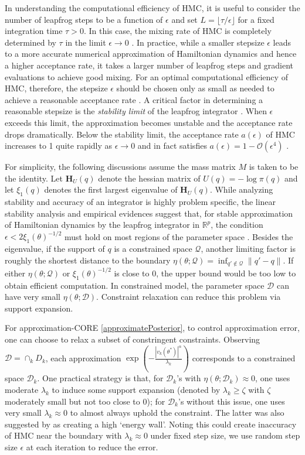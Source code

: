\documentclass[10pt,fleqn]{article}
\newcommand{\bb}[1]{\mathbb{#1}}
\newcommand{\mc}[1]{\mathcal{#1}}
\DeclareMathOperator{\1}{\mathbbm{1}}
\newcommand{\dt}{\epsilon} %
\newcommand{\mass}{M} %
\newcommand{\hess}{\mathbf{H}} %
\begin{document}
In understanding the computational efficiency of HMC, it is useful to
consider the number of leapfrog steps to be a function of $\dt$ and
set $L = \lfloor \tau / \dt \rfloor$ for a fixed integration
time $\tau > 0$. In this case, the mixing rate of HMC is completely
determined by $\tau$ in the limit $\dt \to 0$ \citep{betancourt17}. In
practice, while a smaller stepsize $\dt$ leads to a more accurate
numerical approximation of Hamiltonian dynamics and hence a higher
acceptance rate, it takes a larger number of leapfrog steps and
gradient evaluations to achieve good mixing. For an optimal
computational efficiency of HMC, therefore, the stepsize $\dt$ should
be chosen only as small as needed to achieve a reasonable acceptance
rate \citep{beskos13, betancourt14}. A critical factor in determining
a reasonable stepsize is the \textit{stability limit} of the leapfrog
integrator \citep{neal2011mcmc}. When $\dt$ exceeds this limit, the
approximation becomes unstable and the acceptance rate drops
dramatically. Below the stability limit, the acceptance rate $a(\dt)$
of HMC increases to 1 quite rapidly as $\dt \to 0$ and in fact
satisfies $a(\dt) = 1 - \mc O(\dt^4)$ \citep{beskos13}.

For simplicity, the following discussions assume the mass matrix $\mass$ is taken to be the identity. Let $\hess_U(q)$ denote the hessian matrix of $U(q) = - \log \pi(q)$ and let $\xi_1(q)$ denotes the first largest eigenvalue of $\hess_U(q)$. While analyzing stability and accuracy of an integrator is highly problem specific, the linear stability analysis and empirical evidences suggest that, for stable approximation of Hamiltonian dynamics by the leapfrog integrator in $\bb R^p$, the condition $\dt < 2\xi_1(\theta)^{-1/2}$ must hold on most regions of the parameter space \citep{hairer06}.
Besides the eigenvalue, if the support of $q$ is a constrained space $\mc Q$, another limiting factor is roughly the shortest distance to the boundary $\eta (\theta; {\mc Q})= \inf_{q'\not\in \mc Q}\|q'-q\|$. If either $\eta (\theta; {\mc Q})$ or $\xi_1(\theta)^{-1/2}$ 
is close to $0$, the upper bound would be too low to obtain efficient computation.
In constrained model, the parameter space $\mc D$ can have very small $\eta(\theta;\mc D)$. Constraint relaxation can reduce this problem via support
expansion. 

For approximation-CORE \eqref{approximatePosterior}, to control approximation
error, one can choose to relax a subset of constringent constraints. Observing  $\mc D=\cap_{k} D_k$,
each approximation $\exp(-\frac{|v_k(\theta^*)|^\alpha}{\lambda_k})$ corresponds to a constrained space $\mc D_k$.  One practical strategy is that, for $\mc D_k$'s with $\eta(\theta;\mc D_k)\approx 0$, one uses moderate $\lambda_k$ to induce some support expansion (denoted by $\lambda_k\ge \zeta$ with $\zeta$ moderately small but not too close to $0$);  for $\mc D_k$'s without this issue, one uses very small $\lambda_k\approx 0$ to almost always uphold the constraint.
The latter was also suggested by \cite{neal2011mcmc} as creating a high `energy wall'. Noting this could create  inaccuracy of HMC near the boundary with $\lambda_k\approx 0$ under fixed step size,  we use random step size $\epsilon$ at each iteration to reduce the error.
\end{document}
